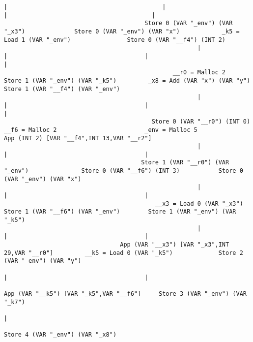 \begin{landscape}
\begin{lstlisting}[basicstyle=\fontsize{6.5}{7.5}\selectfont\ttfamily]
                                                       |                                            |                                       |                                         |
                                        Store 0 (VAR "_env") (VAR "_x3")              Store 0 (VAR "_env") (VAR "x")            _k5 = Load 1 (VAR "_env")                Store 0 (VAR "__f4") (INT 2)
                                                       |                                            |                                       |                                         |
                                                __r0 = Malloc 2                      Store 1 (VAR "_env") (VAR "_k5")         _x8 = Add (VAR "x") (VAR "y")           Store 1 (VAR "__f4") (VAR "_env")
                                                       |                                            |                                       |                                         |
                                          Store 0 (VAR "__r0") (INT 0)                       __f6 = Malloc 2                         _env = Malloc 5              App (INT 2) [VAR "__f4",INT 13,VAR "__r2"]
                                                       |                                            |                                       |
                                       Store 1 (VAR "__r0") (VAR "_env")               Store 0 (VAR "__f6") (INT 3)           Store 0 (VAR "_env") (VAR "x")
                                                       |                                            |                                       |
                                           __x3 = Load 0 (VAR "_x3")                Store 1 (VAR "__f6") (VAR "_env")        Store 1 (VAR "_env") (VAR "_k5")
                                                       |                                            |                                       |
                                 App (VAR "__x3") [VAR "_x3",INT 29,VAR "__r0"]         __k5 = Load 0 (VAR "_k5")             Store 2 (VAR "_env") (VAR "y")
                                                                                                    |                                       |
                                                                                 App (VAR "__k5") [VAR "_k5",VAR "__f6"]     Store 3 (VAR "_env") (VAR "_k7")
                                                                                                                                            |
                                                                                                                             Store 4 (VAR "_env") (VAR "_x8")

\end{lstlisting}
\end{landscape}
